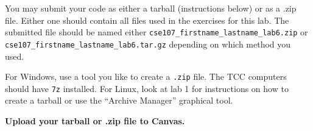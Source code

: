 \documentclass[11pt]{cselabheader}
\begin{document}
You may submit your code as either a tarball (instructions below) or as a .zip
file. Either one should contain all files used in the exercises for this lab.
The submitted file should be named either
\texttt{cse107\_firstname\_lastname\_lab6.zip} or
\texttt{cse107\_firstname\_lastname\_lab6.tar.gz} depending on which method you
used.

For Windows, use a tool you like to create a \texttt{.zip} file. The TCC
computers should have \texttt{7z} installed. For Linux, look at lab 1 for
instructions on how to create a tarball or use the ``Archive Manager'' graphical
tool.

\begin{center}
  \textbf{Upload your tarball or .zip file to Canvas.}
\end{center}
\end{document}
